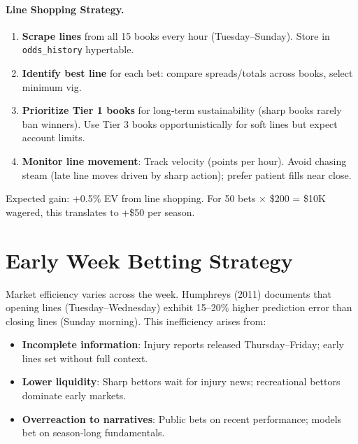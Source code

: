 \paragraph{Line Shopping Strategy.}
\begin{enumerate}
\item \textbf{Scrape lines} from all 15 books every hour (Tuesday--Sunday). Store in \texttt{odds\_history} hypertable.
\item \textbf{Identify best line} for each bet: compare spreads/totals across books, select minimum vig.
\item \textbf{Prioritize Tier 1 books} for long‑term sustainability (sharp books rarely ban winners). Use Tier 3 books opportunistically for soft lines but expect account limits.
\item \textbf{Monitor line movement}: Track velocity (points per hour). Avoid chasing steam (late line moves driven by sharp action); prefer patient fills near close.
\end{enumerate}

Expected gain: +0.5\% EV from line shopping. For 50 bets × \$200 = \$10K wagered, this translates to +\$50 per season.

\section{Early Week Betting Strategy}
\label{sec:early_week}

Market efficiency varies across the week. Humphreys (2011) documents that opening lines (Tuesday--Wednesday) exhibit 15--20\% higher prediction error than closing lines (Sunday morning). This inefficiency arises from:
\begin{itemize}
\item \textbf{Incomplete information}: Injury reports released Thursday--Friday; early lines set without full context.
\item \textbf{Lower liquidity}: Sharp bettors wait for injury news; recreational bettors dominate early markets.
\item \textbf{Overreaction to narratives}: Public bets on recent performance; models bet on season‑long fundamentals.
\end{itemize}

